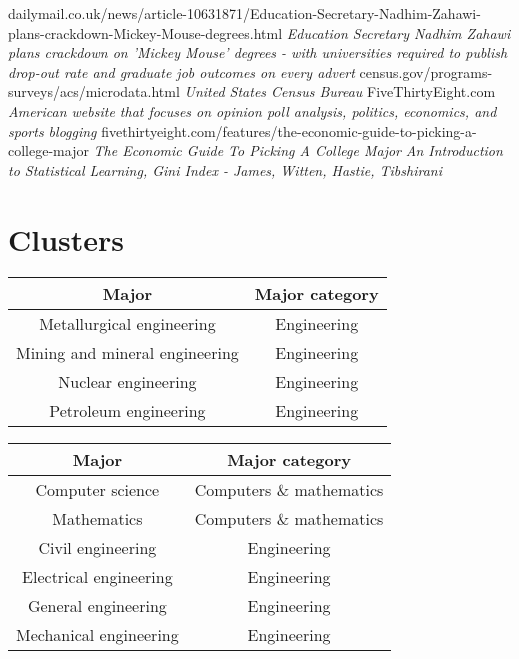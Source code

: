 \documentclass[11pt]{article}
\begin{document}
\begin{thebibliography}{9}
        dailymail.co.uk/news/article-10631871/Education-Secretary-Nadhim-Zahawi-plans-crackdown-Mickey-Mouse-degrees.html \emph{Education Secretary Nadhim Zahawi plans crackdown on 'Mickey Mouse' degrees - with universities required to publish drop-out rate and graduate job outcomes on every advert}
        census.gov/programs-surveys/acs/microdata.html \emph{United States Census Bureau}
        FiveThirtyEight.com \emph{American website that focuses on opinion poll analysis, politics, economics, and sports blogging}
        fivethirtyeight.com/features/the-economic-guide-to-picking-a-college-major \emph{The Economic Guide To Picking A College Major}
        \emph{An Introduction to Statistical Learning, Gini Index - James, Witten, Hastie, Tibshirani}
\end{thebibliography}

\appendix
\section {Clusters}

\begin{center}
    \begin{tabular} {|| c c ||}
    \hline
    Major & Major category \\ [0.5ex]
    \hline\hline
    Metallurgical engineering & Engineering \\
    \hline
    Mining and mineral engineering & Engineering \\
    \hline
    Nuclear engineering & Engineering \\
    \hline
    Petroleum engineering & Engineering \\
    \hline
    \end {tabular}
\end{center}

\begin{center}
    \begin{tabular} {|| c c ||}
    \hline
    Major & Major category \\ [0.5ex]
    \hline\hline

    Computer science & Computers \& mathematics \\
    \hline
    Mathematics & Computers \& mathematics \\
    \hline
    Civil engineering & Engineering \\
    \hline
    Electrical engineering & Engineering \\
    \hline
    General engineering & Engineering \\
    \hline
    Mechanical engineering & Engineering \\
    \hline
    \end {tabular}
\end{center}
\end{document}
